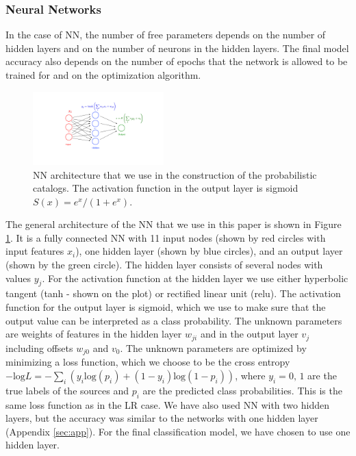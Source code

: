 \subsubsection{Neural Networks}

In the case of NN, the number of free parameters depends on the number of hidden layers and on the number of neurons in the hidden layers. The final model accuracy also depends on the number of epochs that the network is allowed to be trained for and on the optimization algorithm. 

\begin{figure}[h]
\centering
\hspace*{-0.5cm}
\includegraphics[width=0.45\textwidth]{plots/CNN_network.pdf}
\caption{
NN architecture that we use in the construction of the probabilistic catalogs.
The activation function in the output layer is sigmoid $S(x) = {e^{x}}/{(1 + e^{x})}$.
}
\label{fig:NN_structure}
\end{figure}

The general architecture of the NN that we use in this paper is shown in Figure \ref{fig:NN_structure}.
It is a fully connected NN with 11 input nodes (shown by red circles with input features $x_i$), one hidden layer (shown by blue circles),
and an output layer (shown by the green circle).
The hidden layer consists of several nodes with values $y_j$. 
For the activation function at the hidden layer we use either hyperbolic tangent (tanh - shown on the plot) or rectified linear unit (relu).
The activation function for the output layer is sigmoid, which we use to make sure that the output value can be interpreted as a class probability.
The unknown parameters are weights of features in the hidden layer $w_{ji}$ and in the output layer $v_j$ including
offsets $w_{j0}$ and $v_0$.
The unknown parameters are optimized by minimizing a loss function, which we choose to be
the cross entropy
$-\text{log}L = - \sum_i (y_i\text{log}(p_i)+(1-y_i)\text{log}(1 - p_i))$, 
where $y_i = 0,\,1$ are the true labels of the sources and $p_i$ are the predicted class probabilities.
This is the same loss function as in the LR case.
We have also used NN with two hidden layers, but the accuracy was similar to the networks with one hidden layer (Appendix \ref{sec:app}). For the final classification model, we have chosen to use one hidden layer.

